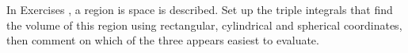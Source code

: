 {\noindent In Exercises} 
{,  a region is space is described. Set up the triple integrals that find the volume of this region using rectangular, cylindrical and spherical coordinates, then comment on which of the three appears easiest to evaluate. 
}
